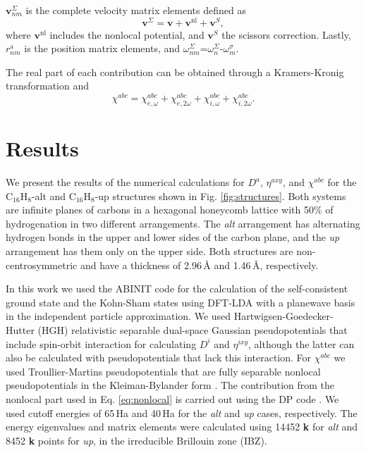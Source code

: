 \documentclass[pss]{wiley2sp} %
\begin{document}
$\mathbf{v}^{\Sigma}_{nm}$ is the complete velocity matrix elements defined as
\begin{equation}\label{eq:nonlocal}
\mathbf{v}^{\Sigma}=\mathbf{v}+\mathbf{v}^{\mathrm{nl}}+\mathbf{v}^{S},
\end{equation}
where $\mathbf{v}^{\mathrm{nl}}$ includes the nonlocal potential, and
$\mathbf{v}^{S}$ the scissors correction. Lastly, $r^{\mathrm{a}}_{nm}$ is the
position matrix elements, and
$\omega^\Sigma_{nm}$=$\omega^{\Sigma}_{n}$-$\omega^{\sigma}_{m}$.

The real part of each contribution can be obtained through a Kramers-Kronig
transformation \cite{tancognePRB14} and
\begin{equation*}\label{eq:chitotal}
    \chi^{abc} = \chi^{abc}_{e,\omega} + \chi^{abc}_{e,2\omega} +
    \chi^{abc}_{i,\omega} + \chi^{abc}_{i,2\omega}
    .
\end{equation*}

\section{Results}\label{sec:results}

We present the results of the numerical calculations for {$D^{a}$}, {$\eta^{axy}$}, and $\chi^{abc}$ for the C$_{16}$H$_{8}$-alt and C$_{16}$H$_{8}$-up structures shown in Fig. \ref{fig:structures}. Both systems are infinite planes of carbons in a hexagonal honeycomb lattice with 50\% of hydrogenation in two different arrangements. The \emph{alt} arrangement has alternating hydrogen bonds in the upper and lower sides of the carbon plane, and the \emph{up} arrangement has them only on the upper side. Both structures are non-centrosymmetric and have a thickness of 2.96\,{\AA} and 1.46\,{\AA}, respectively. 

In this work we used the ABINIT code \cite{torrentCMS08} for the calculation of the self-consistent ground state and the Kohn-Sham states using DFT-LDA with a planewave basis in the independent particle approximation. We used Hartwigsen-Goedecker-Hutter (HGH) relativistic separable dual-space Gaussian pseudopotentials \cite{hartwigsenPRB98} that include spin-orbit interaction for calculating $D^{i}$ and {$\eta^{ixy}$}, although the latter can also be calculated with pseudopotentials that lack this interaction. For $\chi^{abc}$ we used Troullier-Martins pseudopotentials \cite{troullierPRB91} that are fully separable nonlocal pseudopotentials in the Kleiman-Bylander form \cite{kleinmanPRL82}. The contribution from the nonlocal part used in Eq. \eqref{eq:nonlocal} is carried out using the DP code \cite{olevanoDP}. We used cutoff energies of 65\,Ha and 40\,Ha for the \emph{alt} and \emph{up} cases, respectively. The energy eigenvalues and matrix elements were calculated using 14452 \textbf{k} for \emph{alt} and 8452 \textbf{k} points for \emph{up}, in the irreducible Brillouin zone (IBZ).
\end{document}
